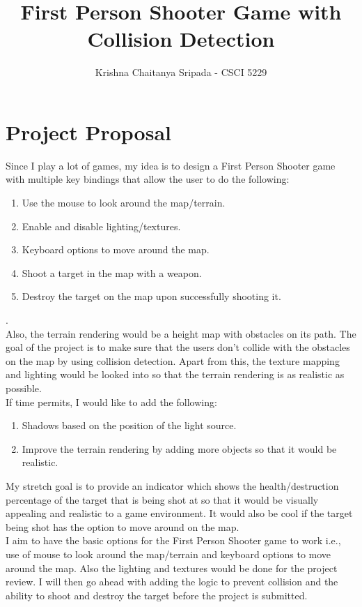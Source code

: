 \documentclass[11pt,psfig,a4]{article}
\begin{document}
\title{First Person Shooter Game with Collision Detection\\}
\author{Krishna Chaitanya Sripada - CSCI 5229}
\maketitle
\section*{Project Proposal}
\begin{flushleft}
Since I play a lot of games, my idea is to design a First Person Shooter game with multiple key bindings that allow the user to do the following:\\
\begin{enumerate}
\item Use the mouse to look around the map/terrain.
\item Enable and disable lighting/textures.
\item Keyboard options to move around the map.
\item Shoot a target in the map with a weapon.
\item Destroy the target on the map upon successfully shooting it.
\end{enumerate}. \\
Also, the terrain rendering would be a height map with obstacles on its path. The goal of the project is to make sure that the users don't collide with the obstacles on the map by using collision detection. Apart from this, the texture mapping and lighting would be looked into so that the terrain rendering is as realistic as possible.\\
\vspace{2em}
If time permits, I would like to add the following: \\
\begin{enumerate}
\item Shadows based on the position of the light source.
\item Improve the terrain rendering by adding more objects so that it would be realistic.
\end{enumerate} 
My stretch goal is to provide an indicator which shows the health/destruction percentage of the target that is being shot at so that it would be visually appealing and realistic to a game environment. It would also be cool if the target being shot has the option to move around on the map.\\
\vspace{2em}
I aim to have the basic options for the First Person Shooter game to work i.e., use of mouse to look around the map/terrain and keyboard options to move around the map. Also the lighting and textures would be done for the project review. I will then go ahead with adding the logic to prevent collision and the ability to shoot and destroy the target before the project is submitted.\\
\end{flushleft}
\end{document}
